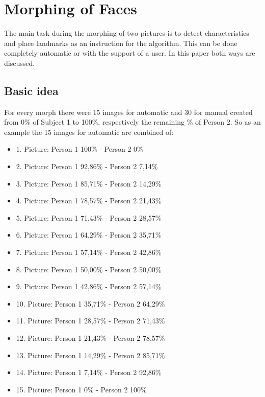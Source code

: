 \section{Morphing of Faces}
\label{morphing}
The main task during the morphing of two pictures is to detect characteristics and place landmarks as an instruction for the algorithm. This can be done completely automatic or with the support of a user. In this paper both ways are discussed.  
\subsection{Basic idea}
\label{percentageMorph}
For every morph there were 15 images for automatic and 30 for manual created from 0\% of Subject 1 to 100\%, respectively the remaining \% of Person 2. So as an example the 15 images for automatic are combined of:
\begin{itemize}
	\item 1. Picture: Person 1 100\% - Person 2 0\%
	\item 2. Picture: Person 1 92,86\% - Person 2 7,14\%
	\item 3. Picture: Person 1 85,71\% - Person 2 14,29\%
	\item 4. Picture: Person 1 78,57\% - Person 2 21,43\%
	\item 5. Picture: Person 1 71,43\% - Person 2 28,57\%
	\item 6. Picture: Person 1 64,29\% - Person 2 35,71\%
	\item 7. Picture: Person 1 57,14\% - Person 2 42,86\%
	\item 8. Picture: Person 1 50,00\% - Person 2 50,00\%
	\item 9. Picture: Person 1 42,86\% - Person 2 57,14\%
	\item 10. Picture: Person 1 35,71\% - Person 2 64,29\%
	\item 11. Picture: Person 1 28,57\% - Person 2 71,43\%
	\item 12. Picture: Person 1 21,43\% - Person 2 78,57\%
	\item 13. Picture: Person 1 14,29\% - Person 2 85,71\%
	\item 14. Picture: Person 1 7,14\% - Person 2 92,86\%
	\item 15. Picture: Person 1 0\% - Person 2 100\%
	\end{itemize}

